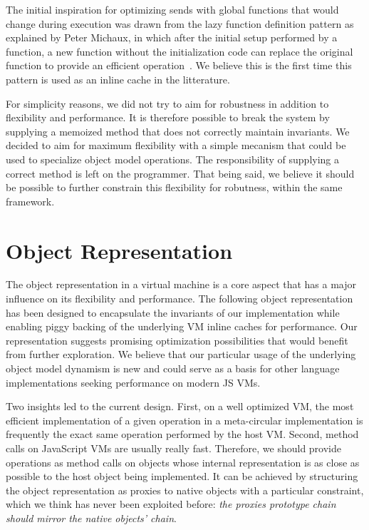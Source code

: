 The initial inspiration for optimizing sends with global functions that would
change during execution was drawn from the lazy function definition pattern as
explained by Peter Michaux, in which after the initial setup performed by a
function, a new function without the initialization code can replace the
original function to provide an efficient
operation~\cite{michaux:LazyFunctionDefinitionPattern}. We believe this is the
first time this pattern is used as an inline cache in the litterature.

For simplicity reasons, we did not try to aim for robustness in addition to
flexibility and performance. It is therefore possible to break the system by
supplying a memoized method that does not correctly maintain invariants. We
decided to aim for maximum flexibility with a simple mecanism that could be
used to specialize object model operations. The responsibility of supplying a
correct method is left on the programmer. That being said, we believe it should
be possible to further constrain this flexibility for robutness, within the
same framework.

\section{Object Representation}

The object representation in a virtual machine is a core aspect that has a
major influence on its flexibility and performance. The following object
representation has been designed to encapsulate the invariants of our
implementation while enabling piggy backing of the underlying VM inline
caches for performance. Our representation suggests promising optimization
possibilities that would benefit from further exploration. We believe that our
particular usage of the underlying object model dynamism is new and could serve
as a basis for other language implementations seeking performance on modern JS
VMs.

Two insights led to the current design. First, on a well optimized VM, the most
efficient implementation of a given operation in a meta-circular implementation
is frequently the exact same operation performed by the host VM. Second, method
calls on JavaScript VMs are usually really fast. Therefore, we should provide
operations as method calls on objects whose internal representation is as close
as possible to the host object being implemented. It can be achieved by
structuring the object representation as proxies to native objects with a
particular constraint, which we think has never been exploited before:
\textit{the proxies prototype chain should mirror the native objects' chain}.

